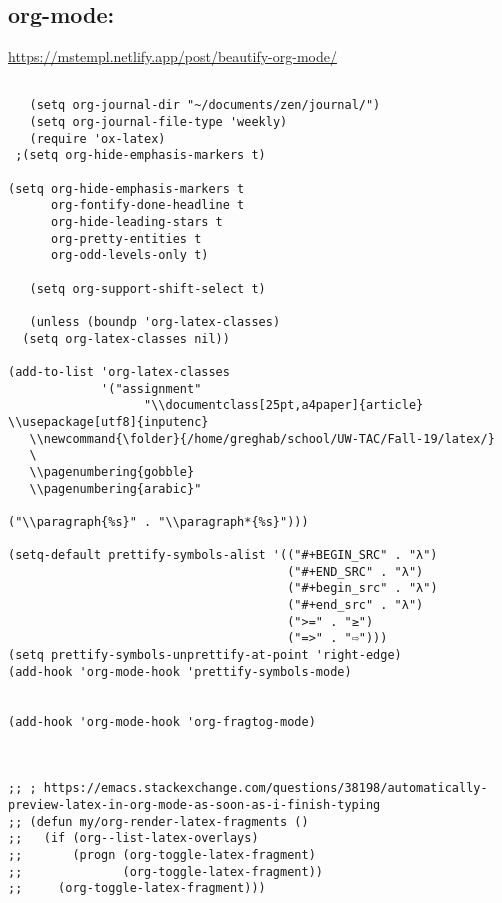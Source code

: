 \documentclass[11pt]{article}
\begin{document}
\subsection{org-mode:}
\label{sec:org4f29229}
\url{https://mstempl.netlify.app/post/beautify-org-mode/}
\begin{verbatim}

   (setq org-journal-dir "~/documents/zen/journal/")
   (setq org-journal-file-type 'weekly)
   (require 'ox-latex)
 ;(setq org-hide-emphasis-markers t)

(setq org-hide-emphasis-markers t
      org-fontify-done-headline t
      org-hide-leading-stars t
      org-pretty-entities t
      org-odd-levels-only t)

   (setq org-support-shift-select t)

   (unless (boundp 'org-latex-classes)
  (setq org-latex-classes nil))

(add-to-list 'org-latex-classes
             '("assignment"
                   "\\documentclass[25pt,a4paper]{article}
\\usepackage[utf8]{inputenc}
   \\newcommand{\folder}{/home/greghab/school/UW-TAC/Fall-19/latex/}
   \
   \\pagenumbering{gobble}
   \\pagenumbering{arabic}"

("\\paragraph{%s}" . "\\paragraph*{%s}")))

(setq-default prettify-symbols-alist '(("#+BEGIN_SRC" . "λ")
                                       ("#+END_SRC" . "λ")
                                       ("#+begin_src" . "λ")
                                       ("#+end_src" . "λ")
                                       (">=" . "≥")
                                       ("=>" . "⇨")))
(setq prettify-symbols-unprettify-at-point 'right-edge)
(add-hook 'org-mode-hook 'prettify-symbols-mode)


(add-hook 'org-mode-hook 'org-fragtog-mode)



;; ; https://emacs.stackexchange.com/questions/38198/automatically-preview-latex-in-org-mode-as-soon-as-i-finish-typing
;; (defun my/org-render-latex-fragments ()
;;   (if (org--list-latex-overlays)
;;       (progn (org-toggle-latex-fragment)
;;              (org-toggle-latex-fragment))
;;     (org-toggle-latex-fragment)))


\end{verbatim}
\end{document}
